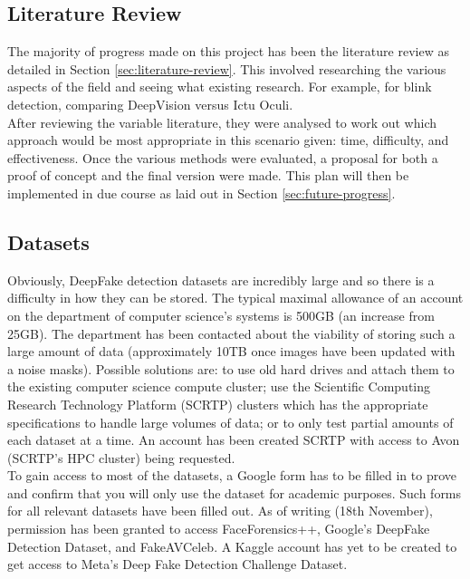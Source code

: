 \documentclass{article}
\begin{document}
\subsection{Literature Review}

The majority of progress made on this project has been the literature review as detailed in Section \ref{sec:literature-review}. This involved researching the various aspects of the field and seeing what existing research. For example, for blink detection, comparing DeepVision versus Ictu Oculi.\\

After reviewing the variable literature, they were analysed to work out which approach would be most appropriate in this scenario given: time, difficulty, and effectiveness. Once the various methods were evaluated, a proposal for both a proof of concept and the final version were made. This plan will then be implemented in due course as laid out in Section \ref{sec:future-progress}.

\subsection{Datasets} \label{sec:datasets}

Obviously, DeepFake detection datasets are incredibly large and so there is a difficulty in how they can be stored. The typical maximal allowance of an account on the department of computer science's systems is 500GB (an increase from 25GB)\cite{dcsquota}. The department has been contacted about the viability of storing such a large amount of data (approximately 10TB once images have been updated with a noise masks). Possible solutions are: to use old hard drives and attach them to the existing computer science compute cluster; use the  Scientific Computing Research Technology Platform (SCRTP) clusters which has the appropriate specifications to handle large volumes of data; or to only test partial amounts of each dataset at a time. An account has been created SCRTP with access to Avon (SCRTP's HPC cluster) being requested.\\

To gain access to most of the datasets, a Google form has to be filled in to prove and confirm that you will only use the dataset for academic purposes. Such forms for all relevant datasets have been filled out. As of writing (18th November), permission has been granted to access FaceForensics++, Google's DeepFake Detection Dataset, and FakeAVCeleb. A Kaggle account has yet to be created to get access to Meta's Deep Fake Detection Challenge Dataset.
\end{document}
